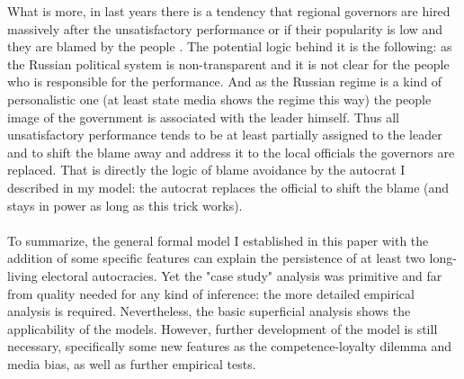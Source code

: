 \documentclass[a4paper, 12pt]{article}
\begin{document}
	\noindent What is more, in last years there is a tendency that regional governors are hired massively after the unsatisfactory performance or if their popularity is low and they are blamed by the people \parencite{governors2}. The potential logic behind it is the following: as the Russian political system is non-transparent and it is not clear for the people who is responsible for the performance. And as the Russian regime is a kind of personalistic one (at least state media shows the regime this way) the people image of the government is associated with the leader himself. Thus all unsatisfactory performance tends to be at least partially assigned to the leader and to shift the blame away and address it to the local officials the governors are replaced. That is directly the logic of blame avoidance by the autocrat I described in my model: the autocrat replaces the official to shift the blame (and stays in power as long as this trick works).
	\\\\
	To summarize, the general formal model I established in this paper with the addition of some specific features can explain the persistence of at least two long-living electoral autocracies. Yet the "case study" analysis was primitive and far from quality needed for any kind of inference: the more detailed empirical analysis is required. Nevertheless, the basic superficial analysis shows the applicability of the models. However, further development of the model is still necessary, specifically some new features as the competence-loyalty dilemma and media bias, as well as further empirical tests.
	
\end{document}
